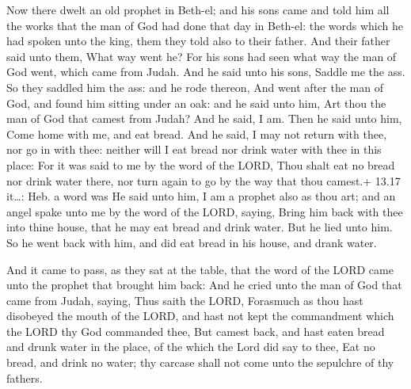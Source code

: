  Now there dwelt an old prophet in Beth-el; and his sons
came and told him all the works that the man of God had done that day in
Beth-el: the words which he had spoken unto the king, them they told
also to their father.  And their father said unto them,
What way went he? For his sons had seen what way the man of God went,
which came from Judah.  And he said unto his sons, Saddle
me the ass. So they saddled him the ass: and he rode thereon,
 And went after the man of God, and found him sitting under
an oak: and he said unto him, Art thou the man of God that camest from
Judah? And he said, I am.  Then he said unto him, Come home
with me, and eat bread.  And he said, I may not return with
thee, nor go in with thee: neither will I eat bread nor drink water with
thee in this place:  For it was said to me by the word of
the LORD, Thou shalt eat no bread nor drink water there, nor turn again
to go by the way that thou camest.+ 13.17 it\ldots: Heb. a word was
 He said unto him, I am a prophet also as thou art; and an
angel spake unto me by the word of the LORD, saying, Bring him back with
thee into thine house, that he may eat bread and drink water. But he
lied unto him.  So he went back with him, and did eat bread
in his house, and drank water.

 And it came to pass, as they sat at the table, that the
word of the LORD came unto the prophet that brought him back:
 And he cried unto the man of God that came from Judah,
saying, Thus saith the LORD, Forasmuch as thou hast disobeyed the mouth
of the LORD, and hast not kept the commandment which the LORD thy God
commanded thee,  But camest back, and hast eaten bread and
drunk water in the place, of the which the Lord did say to thee, Eat no
bread, and drink no water; thy carcase shall not come unto the sepulchre
of thy fathers.

